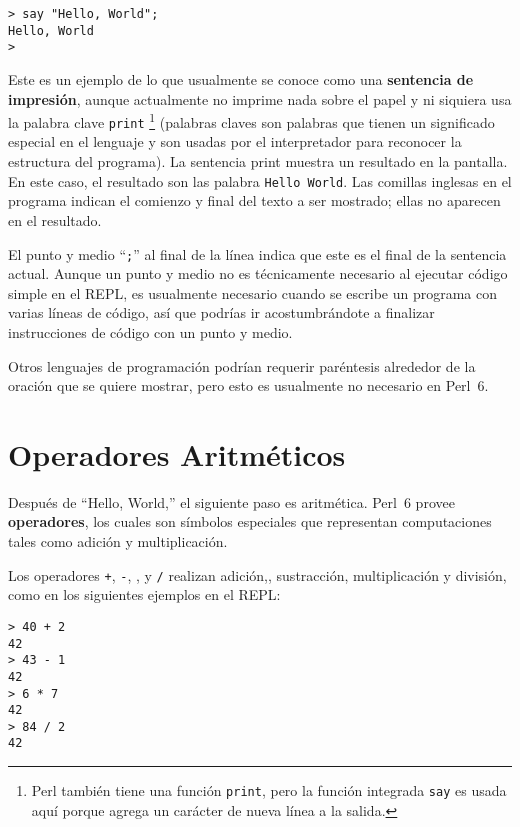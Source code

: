 \begin{verbatim}
> say "Hello, World";
Hello, World
>
\end{verbatim}
%
Este es un ejemplo de lo que usualmente se conoce como una {\bf sentencia de impresión},
aunque actualmente no imprime nada sobre el papel y ni siquiera usa la palabra clave
{\tt print} 
\footnote{Perl también tiene una función {\tt print},
pero la función integrada {\tt say} es usada aquí 
porque agrega un carácter de nueva línea a la salida.}
(palabras claves son palabras que tienen un significado especial
en el lenguaje y son usadas por el interpretador para reconocer la
estructura del programa).
La sentencia print muestra un resultado en la pantalla. En este caso, 
el resultado son las palabra {\tt Hello World}.
%
Las comillas inglesas en el programa indican el comienzo y final
del texto a ser mostrado; ellas no aparecen en el resultado.

El punto y medio ``{\tt ;}'' al final de la línea indica
que este es el final de la sentencia actual. Aunque un punto y medio
no es técnicamente necesario al ejecutar código simple en el REPL, 
es usualmente necesario cuando se escribe un programa con varias líneas
de código, así que podrías ir acostumbrándote a finalizar instrucciones
de código con un punto y medio.   

Otros lenguajes de programación podrían requerir paréntesis
alrededor de la oración que se quiere mostrar, pero esto es usualmente 
no necesario en Perl~6.

\section{Operadores Aritméticos}

Después de ``Hello, World,'' el siguiente paso es aritmética. Perl~6 provee {\bf operadores}, los cuales son símbolos especiales que representan computaciones tales como adición y multiplicación.

Los operadores {\tt +}, {\tt -}, {\tt *}, y {\tt /} realizan adición,, sustracción, multiplicación y división, como en los siguientes ejemplos en el REPL:

\begin{verbatim}
> 40 + 2
42
> 43 - 1
42
> 6 * 7
42
> 84 / 2
42
\end{verbatim}
%

